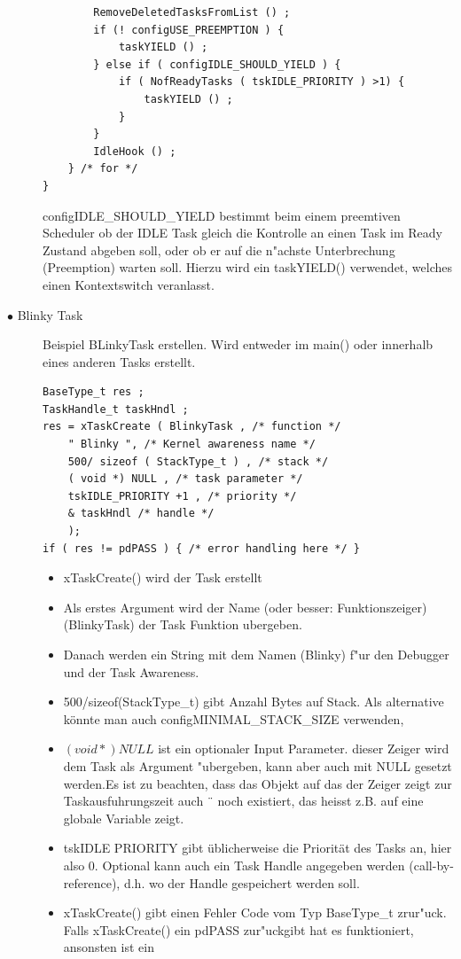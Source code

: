 \documentclass[a4paper, 8pt]{extarticle}
\begin{document}
\begin{multicols*}{3}
\begin{description}
\begin{lstlisting}
		RemoveDeletedTasksFromList () ;
		if (! configUSE_PREEMPTION ) {
			taskYIELD () ;
		} else if ( configIDLE_SHOULD_YIELD ) {
			if ( NofReadyTasks ( tskIDLE_PRIORITY ) >1) {
				taskYIELD () ;
			}
		}
		IdleHook () ;
	} /* for */
}
						\end{lstlisting} 
						configIDLE\_SHOULD\_YIELD bestimmt beim einem preemtiven Scheduler ob
						der IDLE Task gleich die Kontrolle an einen Task im Ready Zustand abgeben
						soll, oder ob er auf die n"achste Unterbrechung (Preemption) warten soll. Hierzu
						wird ein taskYIELD() verwendet, welches einen Kontextswitch veranlasst.
					\item[$\bullet$ Blinky Task]
					Beispiel BLinkyTask erstellen. Wird entweder im main() oder innerhalb eines anderen Tasks erstellt.
						\begin{lstlisting}
BaseType_t res ;
TaskHandle_t taskHndl ;
res = xTaskCreate ( BlinkyTask , /* function */
	" Blinky ", /* Kernel awareness name */
	500/ sizeof ( StackType_t ) , /* stack */
	( void *) NULL , /* task parameter */
	tskIDLE_PRIORITY +1 , /* priority */
	& taskHndl /* handle */
	);
if ( res != pdPASS ) { /* error handling here */ }
						\end{lstlisting}  
							\begin{itemize}
								\item xTaskCreate() wird der Task erstellt
								\item Als erstes Argument wird der Name (oder besser: Funktionszeiger) (BlinkyTask) der Task Funktion ubergeben.								
								\item Danach werden ein String mit dem Namen (Blinky) f"ur den Debugger und der Task Awareness.							
								\item 500/sizeof(StackType\_t) gibt Anzahl Bytes auf Stack. Als alternative könnte man auch configMINIMAL\_STACK\_SIZE verwenden,
								\item $( void *) NULL$ ist ein optionaler Input Parameter. dieser Zeiger wird dem Task als Argument
								 "ubergeben, kann aber auch mit NULL gesetzt werden.Es ist zu beachten, dass das Objekt auf das der Zeiger zeigt zur Taskausfuhrungszeit auch ¨
								 noch existiert, das heisst z.B. auf eine globale Variable zeigt.
								\item tskIDLE PRIORITY gibt üblicherweise die Priorität des Tasks an, hier also 0.  Optional kann auch ein Task Handle
								angegeben werden (call-by-reference), d.h. wo der Handle gespeichert werden
								soll.
								\item xTaskCreate() gibt einen Fehler Code vom Typ BaseType\_t zrur"uck. Falls xTaskCreate() ein pdPASS zur"uckgibt hat es funktioniert, ansonsten ist ein 

\end{itemize}
\end{description}
\end{multicols*}
\end{document}
